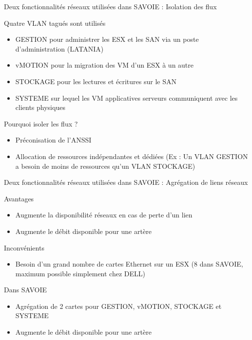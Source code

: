 \begin{frame}{Deux fonctionnalités réseaux utilisées dans SAVOIE : Isolation des flux}
\begin{block}{Quatre VLAN tagués sont utilisés}
\begin{itemize}
\item GESTION pour administrer les ESX et les SAN via un poste d'administration (LATANIA) \pause
\item vMOTION pour la migration des VM d'un ESX à un autre \pause
\item STOCKAGE pour les lectures et écritures sur le SAN \pause
\item SYSTEME sur lequel les VM applicatives serveurs communiquent avec les clients physiques \pause
\end{itemize}
\end{block}
\begin{block}{Pourquoi isoler les flux ?}
\begin{itemize}
    \item Préconisation de l'ANSSI \pause
    \item Allocation de ressources indépendantes et dédiées (Ex : Un VLAN GESTION a besoin de moins de ressources qu'un VLAN STOCKAGE)
\end{itemize}
\end{block}
 
\end{frame}

\begin{frame}{Deux fonctionnalités réseaux utilisées dans SAVOIE : Agrégation de liens réseaux}
\begin{block}{Avantages}
\begin{itemize}
\item Augmente la disponibilité réseaux en cas de perte d'un lien
\item Augmente le débit disponible pour une artère
\end{itemize}
\end{block}
\begin{block}{Inconvénients}
\begin{itemize}
\item Besoin d'un grand nombre de cartes Ethernet sur un ESX (8 dans SAVOIE, maximum possible simplement chez DELL)
\end{itemize}
\end{block} 
\begin{block}{Dans SAVOIE}
\begin{itemize}
\item Agrégation de 2 cartes pour GESTION, vMOTION, STOCKAGE et SYSTEME
\item Augmente le débit disponible pour une artère
\end{itemize}
\end{block}
\end{frame}

